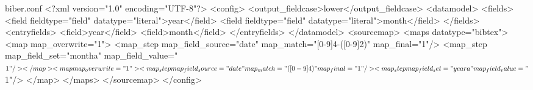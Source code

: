 \setlength{\bibsep}{0.0pt}
\renewcommand\bibfont{\normalfont\sffamily\fontsize{11}{12}\selectfont} %
\RequirePackage{jabbrv}



\begin{filecontents*}{biber.conf}
<?xml version="1.0" encoding="UTF-8"?>
<config>
  <output_fieldcase>lower</output_fieldcase>
  <datamodel>
    <fields>
      <field fieldtype="field" datatype="literal">year</field>
      <field fieldtype="field" datatype="literal">month</field>
    </fields>
    <entryfields>
      <field>year</field>
      <field>month</field>
    </entryfields>
  </datamodel>
  <sourcemap>
    <maps datatype="bibtex">
      <map map_overwrite="1">
        <map_step map_field_source="date" map_match="[0-9]{4}-([0-9]{2})" map_final="1"/>
        <map_step map_field_set="montha" map_field_value="$1"/>
      </map>
      <map map_overwrite="1">
        <map_step map_field_source="date" map_match="([0-9]{4})" map_final="1"/>
        <map_step map_field_set="yeara" map_field_value="$1"/>
      </map>
    </maps>
  </sourcemap>
</config>
\end{filecontents*}